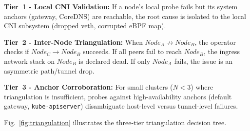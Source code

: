 \documentclass[conference]{IEEEtran}
\begin{document}
\noindent\textbf{Tier~1 - Local CNI Validation:} If a node's local probe fails but its system anchors (gateway, CoreDNS) are reachable, the root cause is isolated to the local CNI subsystem (dropped veth, corrupted eBPF map).

\noindent\textbf{Tier~2 - Inter-Node Triangulation:} When $Node_A \not\to Node_B$, the operator checks if $Node_C \to Node_B$ succeeds. If all peers fail to reach $Node_B$, the ingress network stack on $Node_B$ is declared dead. If only $Node_A$ fails, the issue is an asymmetric path/tunnel drop.

\noindent\textbf{Tier~3 - Anchor Corroboration:} For small clusters ($N < 3$) where triangulation is insufficient, probes against high-availability anchors (default gateway, \texttt{kube-apiserver}) disambiguate host-level versus tunnel-level failures.

Fig.~\ref{fig:triangulation} illustrates the three-tier triangulation decision tree.
\end{document}
